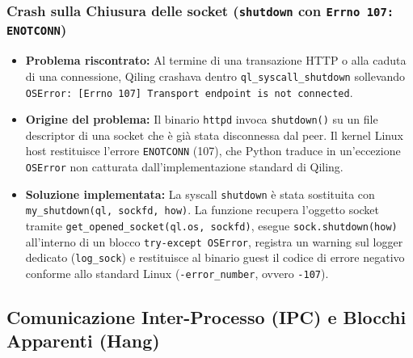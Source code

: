 \documentclass[11pt,a4paper]{article}
\begin{document}
\subsubsection{Crash sulla Chiusura delle socket (\texttt{shutdown} con \texttt{Errno 107: ENOTCONN})}
\begin{itemize}
    \item \textbf{Problema riscontrato:} Al termine di una transazione HTTP o alla caduta di una connessione, Qiling crashava dentro \texttt{ql\_syscall\_shutdown} sollevando \texttt{OSError: [Errno 107] Transport endpoint is not connected}.
    \item \textbf{Origine del problema:} Il binario \texttt{httpd} invoca \texttt{shutdown()} su un file descriptor di una socket che è già stata disconnessa dal peer. Il kernel Linux host restituisce l'errore \texttt{ENOTCONN} (107), che Python traduce in un'eccezione \texttt{OSError} non catturata dall'implementazione standard di Qiling.
    \item \textbf{Soluzione implementata:} La syscall \texttt{shutdown} è stata sostituita con \texttt{my\_shutdown(ql, sockfd, how)}. La funzione recupera l'oggetto socket tramite \texttt{get\_opened\_socket(ql.os, sockfd)}, esegue \texttt{sock.shutdown(how)} all'interno di un blocco \texttt{try-except OSError}, registra un warning sul logger dedicato (\texttt{log\_sock}) e restituisce al binario guest il codice di errore negativo conforme allo standard Linux (\texttt{-error\_number}, ovvero \texttt{-107}).
\end{itemize}

\subsection{Comunicazione Inter-Processo (IPC) e Blocchi Apparenti (Hang)}
\end{document}
